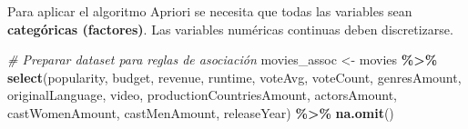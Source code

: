 \documentclass[
]{article}
\newenvironment{Shaded}{\begin{snugshade}}{\end{snugshade}}
\newcommand{\CommentTok}[1]{\textcolor[rgb]{0.56,0.35,0.01}{\textit{#1}}}
\newcommand{\FunctionTok}[1]{\textcolor[rgb]{0.13,0.29,0.53}{\textbf{#1}}}
\newcommand{\NormalTok}[1]{#1}
\newcommand{\OtherTok}[1]{\textcolor[rgb]{0.56,0.35,0.01}{#1}}
\newcommand{\SpecialCharTok}[1]{\textcolor[rgb]{0.81,0.36,0.00}{\textbf{#1}}}
\begin{document}
Para aplicar el algoritmo Apriori se necesita que todas las variables
sean \textbf{categóricas (factores)}. Las variables numéricas continuas
deben discretizarse.

\begin{Shaded}
\begin{Highlighting}[]
\CommentTok{\# Preparar dataset para reglas de asociación}
\NormalTok{movies\_assoc }\OtherTok{\textless{}{-}}\NormalTok{ movies }\SpecialCharTok{\%\textgreater{}\%}
  \FunctionTok{select}\NormalTok{(popularity, budget, revenue, runtime, voteAvg,}
\NormalTok{         voteCount, genresAmount, originalLanguage, video,}
\NormalTok{         productionCountriesAmount, actorsAmount,}
\NormalTok{         castWomenAmount, castMenAmount, releaseYear) }\SpecialCharTok{\%\textgreater{}\%}
  \FunctionTok{na.omit}\NormalTok{()}


\end{Highlighting}
\end{Shaded}
\end{document}
